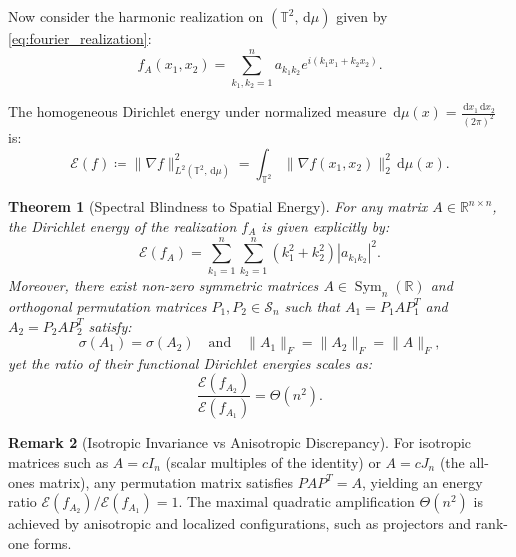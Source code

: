 \documentclass[11pt,a4paper,reqno]{amsart}
\newtheorem{theorem}{Theorem}[section]
\theoremstyle{definition}
\newtheorem{remark}[theorem]{Remark}
\numberwithin{equation}{section}
\providecommand{\R}{\mathbb{R}}
\newcommand{\Tor}{\mathbb{T}}
\newcommand{\dif}{\,\mathrm{d}}
\providecommand{\R}{\mathbb{R}}
\begin{document}
Now consider the harmonic realization on $(\Tor^2, \dif\mu)$ given by \eqref{eq:fourier_realization}:
\begin{equation}
    f_A(x_1, x_2) = \sum_{k_1, k_2 = 1}^n a_{k_1 k_2} e^{i (k_1 x_1 + k_2 x_2)}.
\end{equation}

The homogeneous Dirichlet energy under normalized measure $\dif\mu(x) = \frac{\dif x_1 \dif x_2}{(2\pi)^2}$ is:
\begin{equation}
    \mathcal{E}(f) \coloneqq \|\nabla f\|_{L^2(\Tor^2, \dif\mu)}^2 = \int_{\Tor^2} \|\nabla f(x_1, x_2)\|_2^2 \dif\mu(x).
\end{equation}

\begin{theorem}[Spectral Blindness to Spatial Energy]
\label{thm:dirichlet_blindness}
For any matrix $A \in \R^{n \times n}$, the Dirichlet energy of the realization $f_A$ is given explicitly by:
\begin{equation}
    \label{eq:dirichlet_energy_formula}
    \mathcal{E}(f_A) = \sum_{k_1=1}^n \sum_{k_2=1}^n (k_1^2 + k_2^2) |a_{k_1 k_2}|^2.
\end{equation}
Moreover, there exist non-zero symmetric matrices $A \in \operatorname{Sym}_n(\R)$ and orthogonal permutation matrices $P_1, P_2 \in \mathcal{S}_n$ such that $A_1 = P_1 A P_1^T$ and $A_2 = P_2 A P_2^T$ satisfy:
\begin{equation}
    \sigma(A_1) = \sigma(A_2) \quad \text{and} \quad \|A_1\|_F = \|A_2\|_F = \|A\|_F,
\end{equation}
yet the ratio of their functional Dirichlet energies scales as:
\begin{equation}
    \frac{\mathcal{E}(f_{A_2})}{\mathcal{E}(f_{A_1})} = \Theta(n^2).
\end{equation}
\end{theorem}

\begin{remark}[Isotropic Invariance vs Anisotropic Discrepancy]
For isotropic matrices such as $A = c I_n$ (scalar multiples of the identity) or $A = c J_n$ (the all-ones matrix), any permutation matrix satisfies $P A P^T = A$, yielding an energy ratio $\mathcal{E}(f_{A_2})/\mathcal{E}(f_{A_1}) = 1$. The maximal quadratic amplification $\Theta(n^2)$ is achieved by anisotropic and localized configurations, such as projectors and rank-one forms.
\end{remark}
\end{document}
